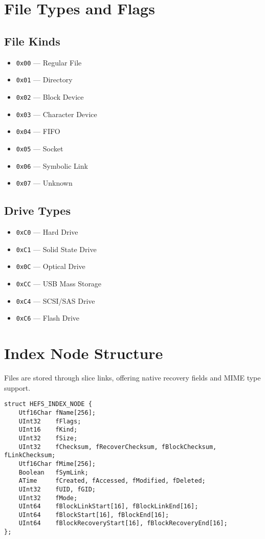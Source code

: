 \documentclass{article}
\begin{document}
\section{File Types and Flags}
\subsection*{File Kinds}
\begin{itemize}[label=--]
    \item \verb|0x00| --- Regular File
    \item \verb|0x01| --- Directory
    \item \verb|0x02| --- Block Device
    \item \verb|0x03| --- Character Device
    \item \verb|0x04| --- FIFO
    \item \verb|0x05| --- Socket
    \item \verb|0x06| --- Symbolic Link
    \item \verb|0x07| --- Unknown
\end{itemize}

\subsection*{Drive Types}
\begin{itemize}[label=--]
    \item \verb|0xC0| --- Hard Drive
    \item \verb|0xC1| --- Solid State Drive
    \item \verb|0x0C| --- Optical Drive
    \item \verb|0xCC| --- USB Mass Storage
    \item \verb|0xC4| --- SCSI/SAS Drive
    \item \verb|0xC6| --- Flash Drive
\end{itemize}

\section{Index Node Structure}
Files are stored through slice links, offering native recovery fields and MIME type support.

\begin{lstlisting}[style=cstyle, caption={HEFS\_INDEX\_NODE structure}]
struct HEFS_INDEX_NODE {
    Utf16Char fName[256];
    UInt32    fFlags;
    UInt16    fKind;
    UInt32    fSize;
    UInt32    fChecksum, fRecoverChecksum, fBlockChecksum, fLinkChecksum;
    Utf16Char fMime[256];
    Boolean   fSymLink;
    ATime     fCreated, fAccessed, fModified, fDeleted;
    UInt32    fUID, fGID;
    UInt32    fMode;
    UInt64    fBlockLinkStart[16], fBlockLinkEnd[16];
    UInt64    fBlockStart[16], fBlockEnd[16];
    UInt64    fBlockRecoveryStart[16], fBlockRecoveryEnd[16];
};
\end{lstlisting}
\end{document}
